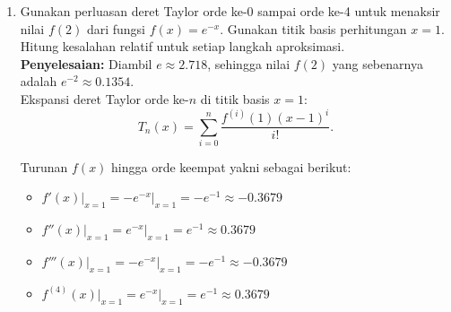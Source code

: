 \documentclass{article}
\newcommand{\penyelesaian}{\textbf{Penyelesaian: }}
\begin{document}
\begin{enumerate}
\begin{enumerate}
        \item $\left[\num{58,6} \times (\num{12e-6}) - (\num{208e-6}) \times \num{1.801}\right]/(\num{468,94e-6})$ \\
        \penyelesaian
        \begin{align*}
            \frac{\num{58,6} \times (\num{12e-6}) - (\num{208e-6}) \times \num{1.801}}{(\num{468,94e-6})} 
            &= \frac{\num{703,2e-6} - (\num{374608e-6})}{(\num{468,94e-6})} \\
            &= \frac{\num{7,0e-4} - (\num{3,75e-1})}{(\num{468,94e-6})} \\
            &= \frac{\num{0,0007e0} - \num{0,375e0}}{(\num{468,94e-6})} \\
            &= \frac{\num{0,0007e0} - \num{0,38e0}}{(\num{468,94e-6})} \\
            &= \frac{\num{-0,3793e0}}{(\num{468,94e-6})} \\
            &= \num{-8,0884e2} \\
            &\approx \num{-8,088e2}
        \end{align*}
    \end{enumerate}

    \item Gunakan perluasan deret Taylor orde ke-0 sampai orde ke-4 untuk menaksir nilai $f(2)$ dari fungsi $f(x) = e^{-x}$.  
    Gunakan titik basis perhitungan $x = 1$. Hitung kesalahan relatif untuk setiap langkah aproksimasi. \\
    \penyelesaian Diambil $e \approx \num{2,718}$, sehingga nilai $f(2)$ yang sebenarnya adalah $e^{-2} \approx \num{0,1354}$. \\

    Ekspansi deret Taylor orde ke-$n$ di titik basis $x = 1$:
    \begin{equation*}
        T_n(x) = \sum_{i=0}^{n}\frac{f^{(i)}(1)(x-1)^i}{i!}.
    \end{equation*}

    Turunan $f(x)$ hingga orde keempat yakni sebagai berikut:
    \begin{itemize}  
        \item $f'(x)\big|_{x=1} = -e^{-x}\big|_{x=1} = -e^{-1} \approx \num{-0,3679}$
        \item $f''(x)\big|_{x=1} = e^{-x}\big|_{x=1} = e^{-1} \approx \num{0,3679}$
        \item $f'''(x)\big|_{x=1} = -e^{-x}\big|_{x=1} = -e^{-1} \approx \num{-0,3679}$  
        \item $f^{(4)}(x)\big|_{x=1} = e^{-x} \big|_{x=1} = e^{-1} \approx \num{0,3679}$  
    \end{itemize}


\end{enumerate}
\end{document}

